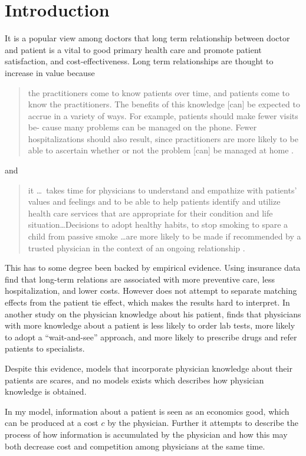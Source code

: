 \documentclass[11pt,a4paper,oneside]{article}
\begin{document}
\section{Introduction}
It is a popular view among doctors that long term relationship between doctor and patient is a vital to good primary health care and promote patient satisfaction, and cost-effectiveness. Long term relationships are thought to increase in value because
\begin{quotation}
the practitioners come to know patients over time, and patients come to know the practitioners. The benefits of this knowledge [can] be expected to accrue in a variety of ways. For example, patients should make fewer visits be- cause many problems can be managed on the phone. Fewer hospitalizations should also result, since practitioners are more likely to be able to ascertain whether or not the problem [can] be managed at home \parencite[p. 41--42]{Starfield1992}.
\end{quotation}
and
\begin{quotation}
it \ldots \ takes time for physicians to understand and empathize with patients' values and feelings and to be able to help patients identify and utilize health care services that are appropriate for their condition and life situation\ldots Decisions to adopt healthy habits, to stop smoking to spare a child from passive smoke \ldots are more likely to be made if recommended by a trusted physician in the context of an ongoing relationship \parencite[p. 324--235]{Emanuel1995}.
\end{quotation}
This has to some degree been backed by empirical evidence. Using insurance data \textcite{Weiss1996} find that long-term relations are associated with more preventive care, less hospitalization, and lower costs. However \citeauthor{Weiss1996} does not attempt to separate matching effects from the patient tie effect, which makes the results hard to interpret. In another study on the physician knowledge about his patient,   \textcite{Hjortdahl1991}  finds that physicians with more knowledge about a patient is less likely to order lab tests, more likely to adopt a ``wait-and-see'' approach, and more likely to prescribe drugs and refer patients to specialists.

Despite this evidence, models that incorporate physician knowledge about their patients are scares, and no models exists which describes how physician knowledge is obtained.

In my model, information about a patient is seen as an economics good, which can be produced at a cost \(c\) by the physician. Further it attempts to describe the process of how information is accumulated by the physician and how this may both decrease cost and competition among physicians at the same time.
\end{document}
